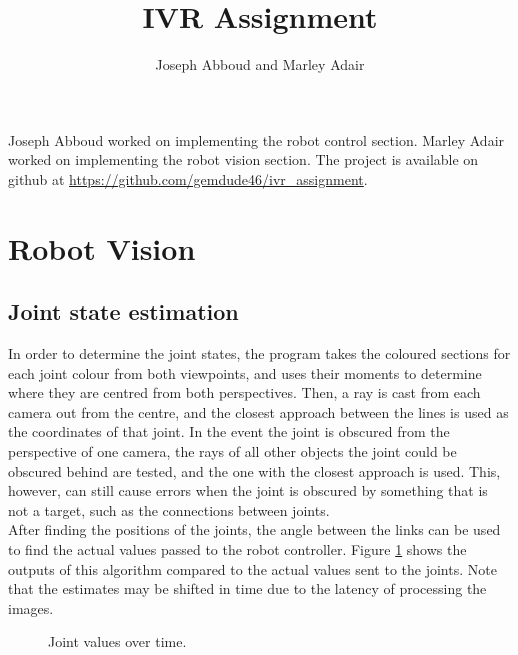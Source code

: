 \documentclass{article}
\begin{document}
\title{IVR Assignment}
\author{Joseph Abboud and Marley Adair}
\date{}
\maketitle

Joseph Abboud worked on implementing the robot control section. Marley Adair worked on implementing the robot vision section. The project is available on github at \url{https://github.com/gemdude46/ivr_assignment}. \\

\section{Robot Vision}

\subsection{Joint state estimation}

In order to determine the joint states, the program takes the coloured sections for each joint colour from both viewpoints, and uses their moments to determine where they are centred from both perspectives. Then, a ray is cast from each camera out from the centre, and
the closest approach between the lines is used as the coordinates of that joint. In the event the joint is obscured from the perspective of one camera, the rays of all other objects the joint could be obscured behind are tested, and the one with the closest approach
is used. This, however, can still cause errors when the joint is obscured by something that is not a target, such as the connections between joints. \\

After finding the positions of the joints, the angle between the links can be used to find the actual values passed to the robot controller. Figure \ref{fig:visionjointplot} shows the outputs of this algorithm compared to the actual values sent to the joints. Note that
the estimates may be shifted in time due to the latency of processing the images. \\

\begin{figure}
	\caption{Joint values over time.}
	\label{fig:visionjointplot}
\end{figure}
\end{document}
